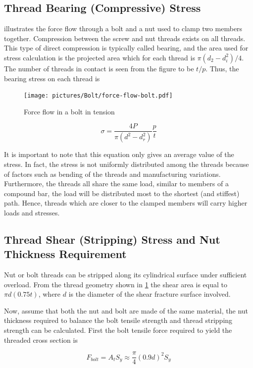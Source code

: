 \documentclass[a4paper,openany,12pt]{book}
\begin{document}
{{\subsection{Thread Bearing (Compressive) Stress}
\label{thread-bearing-compressive-stress}
illustrates the force flow through a bolt and a nut used to clamp two
members together. Compression between the screw and nut threads exists
on all threads. This type of direct compression is typically called
bearing, and the area used for stress calculation is the projected area
which for each thread is \(\pi(d_2 - d_i^2) / 4\). The number of threads
in contact is seen from the figure to be \(t/p\). Thus, the bearing stress
on each thread is


\begin{figure}[htbp]
\centering
\texttt{[image: pictures/Bolt/force-flow-bolt.pdf]}
\caption{\label{fig: force flow in bolt}Force flow in a bolt in tension \cite{juvinall2006fundamentals}}
\end{figure}

$$\sigma  = \frac{4P}{\pi (d^2 - d_r^2)}\frac{p}{t}$$

It is important to note that this equation only gives an average value
of the stress. In fact, the stress is not uniformly distributed among
the threads because of factors such as bending of the threads and
manufacturing variations. Furthermore, the threads all share the same
load, similar to members of a compound bar, the load will be distributed
most to the shortest (and stiffest) path. Hence, threads which are
closer to the clamped members will carry higher loads and stresses.

\subsection{Thread Shear (Stripping) Stress and Nut Thickness Requirement}
\label{thread-shear-stripping-stress-and-nut-thickness-requirement}
Nut or bolt threads can be stripped along its cylindrical surface under
sufficient overload. From the thread geometry shown in
\ref{fig: force flow in bolt} the shear area
is equal to \(\pi d(0.75t)\), where \(d\) is the diameter of the shear
fracture surface involved.

Now, assume that both the nut and bolt are made of the same material,
the nut thickness required to balance the bolt tensile strength and
thread stripping strength can be calculated. First the bolt tensile
force required to yield the threaded cross section is

$$F_{bolt} = A_tS_y \approx \frac{\pi}{4}(0.9d)^2S_y$$

}}
\end{document}
